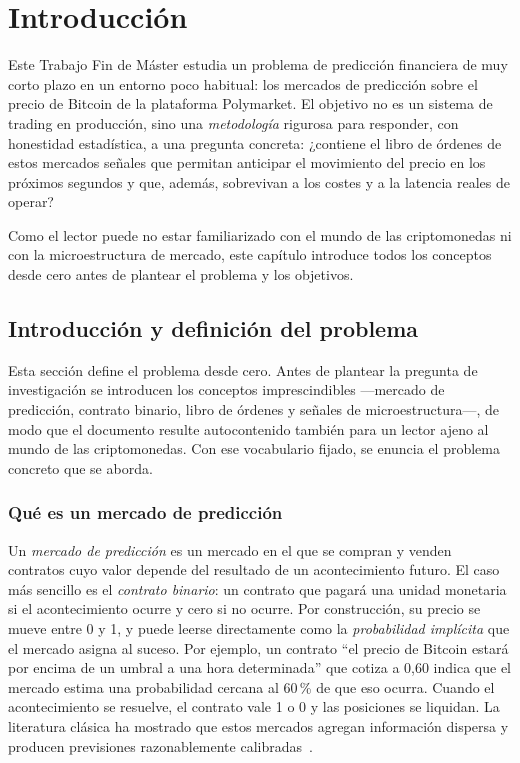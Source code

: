 %
\chapter{Introducción}
\label{ch::introduccion}

Este Trabajo Fin de Máster estudia un problema de predicción financiera de muy corto
plazo en un entorno poco habitual: los mercados de predicción sobre el precio de Bitcoin
de la plataforma Polymarket. El objetivo no es un sistema de trading en producción, sino
una \emph{metodología} rigurosa para responder, con honestidad estadística, a una
pregunta concreta: ¿contiene el libro de órdenes de estos mercados señales que permitan
anticipar el movimiento del precio en los próximos segundos y que, además, sobrevivan a
los costes y a la latencia reales de operar?

Como el lector puede no estar familiarizado con el mundo de las criptomonedas ni con la
microestructura de mercado, este capítulo introduce todos los conceptos desde cero antes
de plantear el problema y los objetivos.

\section{Introducción y definición del problema}

Esta sección define el problema desde cero. Antes de plantear la pregunta de
investigación se introducen los conceptos imprescindibles —mercado de predicción,
contrato binario, libro de órdenes y señales de microestructura—, de modo que el documento
resulte autocontenido también para un lector ajeno al mundo de las criptomonedas. Con ese
vocabulario fijado, se enuncia el problema concreto que se aborda.

\subsection{Qué es un mercado de predicción}

Un \emph{mercado de predicción} es un mercado en el que se compran y venden contratos
cuyo valor depende del resultado de un acontecimiento futuro. El caso más sencillo es el
\emph{contrato binario}: un contrato que pagará una unidad monetaria si el acontecimiento
ocurre y cero si no ocurre. Por construcción, su precio se mueve entre 0 y 1, y puede
leerse directamente como la \emph{probabilidad implícita} que el mercado asigna al
suceso. Por ejemplo, un contrato ``el precio de Bitcoin estará por encima de un umbral a
una hora determinada'' que cotiza a 0,60 indica que el mercado estima una probabilidad
cercana al 60\,\% de que eso ocurra. Cuando el acontecimiento se resuelve, el contrato
vale 1 o 0 y las posiciones se liquidan. La literatura clásica ha mostrado que estos
mercados agregan información dispersa y producen previsiones razonablemente
calibradas~\cite{wolfers2004prediction}.

